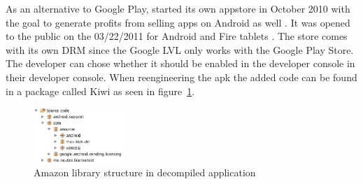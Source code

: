 As an alternative to Google Play, started its own appstore in October 2010 with the goal to generate profits from selling apps on Android as well \cite{amazonBeta}.
It was opened to the public on the 03/22/2011 for Android and Fire tablets \cite{amazonRelease}.
The store comes with its own DRM since the Google LVL only works with the Google Play Store.
The developer can chose whether it should be enabled in the developer console  in their developer console.
When reengineering the \gls{apk} the added code can be found in a package called Kiwi as seen in figure~\ref{fig:amazonFolder}. \cite{amazonDeveloper}
\begin{figure}[h]
    \centering
    \includegraphics[width=0.3\textwidth]{data/amazonFolder.png}
    \caption{Amazon library structure in decompiled application}
    \label{fig:amazonFolder}
\end{figure}
